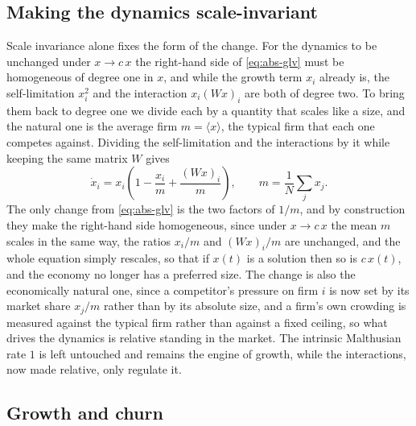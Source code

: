 \subsection{Making the dynamics scale-invariant}
\label{sec:relative-derivation}

Scale invariance alone fixes the form of the change. For the dynamics to be unchanged under
$x \to c\,x$ the right-hand side of \eqref{eq:abs-glv} must be homogeneous of degree one in $x$,
and while the growth term $x_i$ already is, the self-limitation $x_i^2$ and the interaction
$x_i (Wx)_i$ are both of degree two. To bring them back to degree one we divide each by a quantity
that scales like a size, and the natural one is the average firm $m = \langle x\rangle$, the
typical firm that each one competes against. Dividing the self-limitation and the interactions by
it while keeping the same matrix $W$ gives
\begin{equation}
    \dot{x}_i = x_i \left( 1 - \frac{x_i}{m} + \frac{(Wx)_i}{m} \right),
    \qquad m = \frac{1}{N}\sum_j x_j .
    \label{eq:relative-glv}
\end{equation}
The only change from \eqref{eq:abs-glv} is the two factors of $1/m$, and by construction they make
the right-hand side homogeneous, since under $x \to c\,x$ the mean $m$ scales in the same way, the
ratios $x_i/m$ and $(Wx)_i/m$ are unchanged, and the whole equation simply rescales, so that if
$x(t)$ is a solution then so is $c\,x(t)$, and the economy no longer has a preferred size. The change
is also the economically natural one, since a competitor's pressure on firm $i$ is now set by its
market share $x_j/m$ rather than by its absolute size, and a firm's own crowding is measured
against the typical firm rather than against a fixed ceiling, so what drives the dynamics is
relative standing in the market. The intrinsic Malthusian rate $1$ is left untouched and remains
the engine of growth, while the interactions, now made relative, only regulate it.

\subsection{Growth and churn}
\label{sec:growth-churn}


